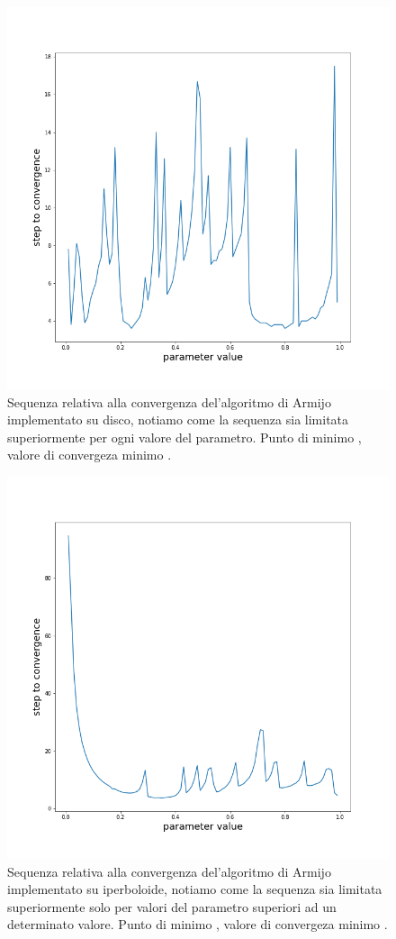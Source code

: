 \documentclass[a4paper, 12pt]{article}
\begin{document}
\begin{figure}[H] %
    \centering\includegraphics[width=1\textwidth]{armijo_parameter_poincare.png}
    \caption{Sequenza relativa alla convergenza del'algoritmo di Armijo implementato su disco, notiamo come la sequenza sia limitata superiormente per ogni valore del parametro. Punto di minimo , valore di convergeza minimo .}
\end{figure}
\begin{figure}[H] %
    \centering\includegraphics[width=1\textwidth]{armijo_parameter_hyperboloid.png}
    \caption{Sequenza relativa alla convergenza del'algoritmo di Armijo implementato su iperboloide, notiamo come la sequenza sia limitata superiormente solo per valori del parametro superiori ad un determinato valore. Punto di minimo , valore di convergeza minimo .}
\end{figure}
\end{document}
